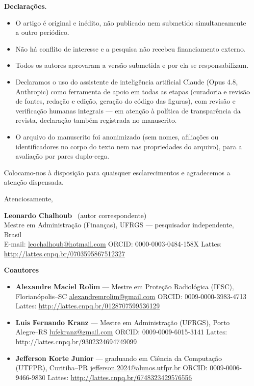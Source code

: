 \documentclass[12pt,a4paper,oneside]{article}
\begin{document}
\medskip
\noindent\textbf{Declarações.}
\begin{itemize}
  \item O artigo é original e inédito, não publicado nem submetido
  simultaneamente a outro periódico.
  \item Não há conflito de interesse e a pesquisa não recebeu financiamento externo.
  \item Todos os autores aprovaram a versão submetida e por ela se responsabilizam.
  \item Declaramos o uso do assistente de inteligência artificial Claude (Opus
  4.8, Anthropic) como ferramenta de apoio em todas as etapas (curadoria e
  revisão de fontes, redação e edição, geração do código das figuras), com
  revisão e verificação humanas integrais --- em atenção à política de
  transparência da revista, declaração também registrada no manuscrito.
  \item O arquivo do manuscrito foi anonimizado (sem nomes, afiliações ou
  identificadores no corpo do texto nem nas propriedades do arquivo), para a
  avaliação por pares duplo-cega.
\end{itemize}

\medskip
Colocamo-nos à disposição para quaisquer esclarecimentos e agradecemos a
atenção dispensada.

\bigskip
\noindent Atenciosamente,

\medskip
\noindent\textbf{Leonardo Chalhoub} \, (autor correspondente)\\
Mestre em Administração (Finanças), UFRGS --- pesquisador independente, Brasil\\
E-mail: \href{mailto:leochalhoub@hotmail.com}{leochalhoub@hotmail.com} \textbullet{}
ORCID: 0000-0003-0484-158X \textbullet{}
Lattes: \url{http://lattes.cnpq.br/0703595867512327}

\medskip
\noindent\textbf{Coautores}
\begin{itemize}
  \item \textbf{Alexandre Maciel Rolim} --- Mestre em Proteção Radiológica
  (IFSC), Florianópolis--SC \textbullet{}
  \href{mailto:alexandremrolim@gmail.com}{alexandremrolim@gmail.com} \textbullet{}
  ORCID: 0009-0000-3983-4713 \textbullet{} Lattes: \url{http://lattes.cnpq.br/0128707599536129}
  \item \textbf{Luis Fernando Kranz} --- Mestre em Administração (UFRGS),
  Porto Alegre--RS \textbullet{}
  \href{mailto:lufekranz@gmail.com}{lufekranz@gmail.com} \textbullet{}
  ORCID: 0009-0009-6015-3141 \textbullet{} Lattes: \url{http://lattes.cnpq.br/9302324694749099}
  \item \textbf{Jefferson Korte Junior} --- graduando em Ciência da Computação
  (UTFPR), Curitiba--PR \textbullet{}
  \href{mailto:jefferson.2024@alunos.utfpr.br}{jefferson.2024@alunos.utfpr.br} \textbullet{}
  ORCID: 0009-0006-9466-9830 \textbullet{} Lattes: \url{http://lattes.cnpq.br/6748323429576556}
\end{itemize}
\end{document}
